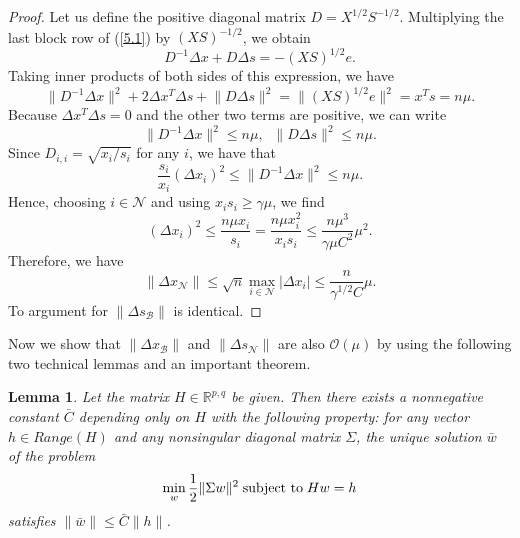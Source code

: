 \documentclass[a4paper,10 pt,titlepage,twoside]{book}
\theoremstyle{plain}
\newtheorem{lem}[thm]{Lemma}
\theoremstyle{definition}
\theoremstyle{remark}
\begin{document}
\begin{proof}
	Let us define the positive diagonal matrix $D = X^{1/2}S^{-1/2}$. Multiplying the last block row of (\ref{5.1}) by $(XS)^{-1/2}$, we obtain 
	\begin{equation*}
	D^{-1}\Delta x + D \Delta s = -(XS)^{1/2}e.
	\end{equation*}
	Taking inner products of both sides of this expression, we have
	\begin{equation*}
	\lVert D^{-1}\Delta x \rVert^{2} + 2\Delta x^{T}\Delta s+ \lVert D\Delta s \rVert^{2}= \lVert(XS)^{1/2}e\rVert^{2}= x^{T}s= n\mu.
	\end{equation*}
	Because $\Delta x^{T}\Delta s= 0$ and the other two terms are positive, we can write
	\begin{equation*}
	\lVert D^{-1}\Delta x\rVert^{2}\leq n\mu, \;\;\lVert D\Delta s\rVert^{2}\leq n\mu.
	\end{equation*}
	Since $D_{i,i}= \sqrt{x_{i}/s_{i}}$ for any $i$, we have that
	\begin{equation*}
	\frac{s_{i}}{x_{i}}(\Delta x_{i})^{2}\leq\lVert D^{-1}\Delta x\rVert^{2}\leq n\mu.
	\end{equation*}
	Hence, choosing $i\in\mathcal{N}$ and using $x_{i}s_{i}\geq\gamma\mu$, we find
	\begin{equation*}
	(\Delta x_{i})^{2}\leq\frac{n\mu x_{i}}{s_{i}}=\frac{n\mu x_{i}^{2}}{x_{i}s_{i}}\leq\frac{n\mu^{3}}{\gamma\mu C^{2}}\mu^{2}.
	\end{equation*}
	Therefore, we have 
	\begin{equation*}
	\lVert \Delta x_{\mathcal{N}}\rVert \leq \sqrt{n}\max\limits_{i \in \mathcal{N}}|\Delta x_{i}|\leq\frac{n}{\gamma^{1/2}C}\mu.
	\end{equation*}
	To argument for $\lVert \Delta s_{\mathcal{B}}\rVert$ is identical.
\end{proof}
Now we show that $\lVert \Delta x_{\mathcal{B}}\rVert$ and $\lVert \Delta s_{\mathcal{N}}\rVert$ are also $\mathcal{O}(\mu)$ by using the following two technical lemmas and an important theorem.
\begin{lem} \label{(T)}
	Let the matrix $H\in\mathbb{R}^{p,q}$ be given. Then there exists a nonnegative constant $\bar{C}$ depending only on $H$ with the following property: for any vector $h\in Range(H)$ and any nonsingular diagonal matrix $\Sigma$, the unique solution $\bar{w}$ of the problem
	\begin{align*}
	\min\limits_{w}\frac{1}{2}\lVert\Sigma w\rVert^{2} \text{\;subject to\;} Hw = h
	\end{align*}
	satisfies $\lVert\bar{w}\rVert\leq \bar{C}\lVert h\rVert$.
\end{lem}
\end{document}
